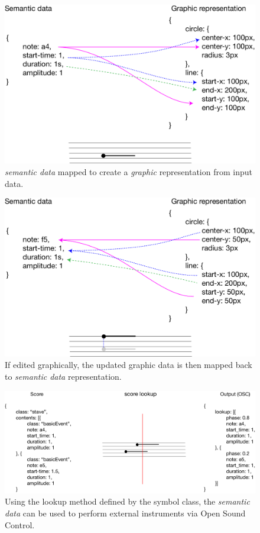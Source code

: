 \documentclass{article}
\begin{document}

\begin{figure}[ht!]
\centering
\includegraphics[width=0.9\columnwidth]{data-to-graphic.pdf}
\caption{\textit{semantic data} mapped to create a \textit{graphic} representation from input data.
\label{fig:data-to-graphic}}
\end{figure}

\begin{figure}[ht!]
\centering
\includegraphics[width=0.9\columnwidth]{graphic-to-data.pdf}
\caption{If edited graphically, the updated graphic data is then mapped back to \textit{semantic data} representation. 
\label{fig:graphic-to-data}}
\end{figure}

\begin{figure}[ht!]
\centering
\includegraphics[width=1\columnwidth]{score-lookup.pdf}
\caption{Using the lookup method defined by the symbol class, the \textit{semantic data} can be used to perform external instruments via Open Sound Control. 
\label{fig:score-lookup}}
\end{figure}
\end{document}
